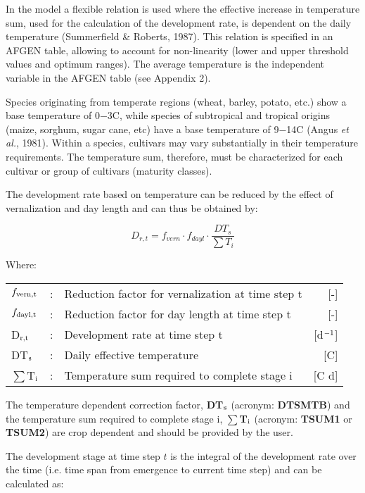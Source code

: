 In the model a flexible relation is used where the effective increase in temperature
sum, used for the calculation of the development rate, is dependent on the daily temperature 
(Summerfield \& Roberts, 1987). This relation is specified in an AFGEN table, 
allowing to account for non-linearity (lower and upper threshold values and optimum
ranges). The average temperature is the independent variable in the AFGEN table (see
Appendix 2). 

Species originating from temperate regions (wheat, barley, potato, etc.) show a base temperature of
0$-$3\textdegree C, while species of subtropical and tropical origins (maize, sorghum, sugar cane, etc) 
have a base temperature of 9$-$14\textdegree C (Angus {\it et al.}, 1981). Within a species, 
cultivars may vary substantially  in their temperature requirements. The temperature sum, therefore, 
must be characterized for each cultivar or group of cultivars (maturity classes).   

The development rate based on temperature can be reduced by the effect of vernalization and 
day length and can thus be obtained by:

\begin{equation}
\label{eq:5.3}
D_{r,t} = {f_{vern}} \cdot {f_{dayl}} \cdot {\frac{DT_{s}}{\sum T_{i}}}
\end{equation}

Where:\\[5pt]
\begin{tabularx}{\textwidth}{llXr}
	$f_{{\rm vern,t}}$ &:& Reduction factor for vernalization at time step t  & [-]\\
	$f_{{\rm dayl,t}}$ &:& Reduction factor for day length at time step t  & [-]\\
	D$_{{\rm r,t}}$ &:& Development rate at time step t  & [d$^{{\rm -1}}$]\\
	DT$_{{\rm s}}$ &:& Daily effective temperature & [\textdegree C]\\
	$\sum$T$_{{\rm i}}$ &:& Temperature sum required to complete stage i & [\textdegree C d]\\
\end{tabularx}

The temperature dependent correction factor, {\bf DT$_{{\rm s}}$} (acronym: {\bf DTSMTB}) and 
the temperature sum required to complete stage i, {\bf $\sum$T$_{{\rm i}}$} (acronym: 
{\bf TSUM1} or {\bf TSUM2}) are crop dependent and should be provided by the user.

The development stage at time step $t$ is the integral of the development rate over the time
(i.e. time span from emergence to current time step) and can be calculated as:

